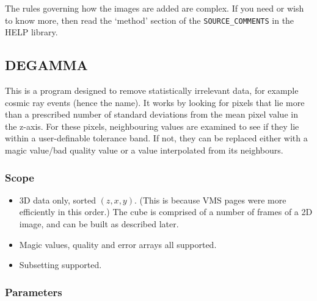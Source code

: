 The rules governing how the images are added are complex. If you need or wish
to know more, then read the `method' section of the {\tt SOURCE\_COMMENTS} in
the HELP library.

\subsection{DEGAMMA}

This is a program designed to remove statistically irrelevant data, for example
cosmic ray events (hence the name). It works by looking for pixels that lie
more than a prescribed number of standard deviations from the mean pixel value
in the z-axis. For these pixels, neighbouring values are examined to see if
they lie within a user-definable tolerance band. If not, they can be replaced
either with a magic value/bad quality value or a value interpolated from its
neighbours.

\subsubsection{Scope}

\begin{itemize}
\item 3D data only, sorted $(z,x,y)$. (This is because VMS pages were more
efficiently in this order.) The cube is comprised of a number of frames of a 2D
image, and can be built as described later.
\item Magic values, quality and error arrays all supported.
\item Subsetting supported.
\end{itemize}

\subsubsection{Parameters}

